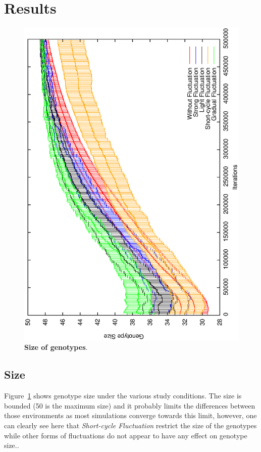 \documentclass[letterpaper]{article}
\begin{document}
\section{Results}\label{sec:results}
\begin{figure}[h]
\centering
\includegraphics[width=0.7\columnwidth, angle =-90 ]{Size}
\caption{\textbf{Size of genotypes}. 
}
\label{fig:Size}
\end{figure}

\subsection{Size}
Figure~\ref{fig:Size} shows genotype size under the various study conditions. The size is bounded (50 is the maximum size) and it probably limits the differences between those environments as most simulations converge towards this limit, however, one can clearly see here that \emph{Short-cycle Fluctuation} restrict the size of the genotypes while other forms of fluctuations do not appear to have any effect on genotype size..
\end{document}
